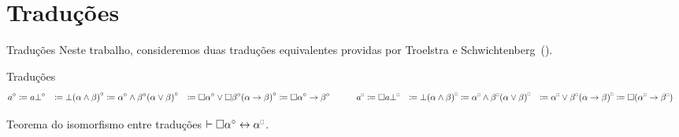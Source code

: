 \documentclass[table]{beamer}
\newcommand{\smallsquare}{{\scalebox{0.45}{$\square$}}}
\def\\{}%
\begin{document}
    \section[]{Traduções}
    \begin{frame}{Traduções}
        \justifying{}
        Neste trabalho, consideremos duas traduções equivalentes providas por Troelstra e Schwichtenberg~(\citeyear{Troelstra}).
        \begin{block}{Traduções}
            \begin{equation*}
            \begin{aligned}[t]
                a^\circ                       & \coloneqq a \\
                \bot^\circ                    & \coloneqq \bot \\
                {(\alpha \wedge \beta)}^\circ & \coloneqq \alpha^\circ \wedge \beta^\circ \\
                {(\alpha \vee \beta)}^\circ   & \coloneqq \Box \alpha^\circ \vee \Box \beta^\circ \\
                {(\alpha \to \beta)}^\circ    & \coloneqq \Box \alpha^\circ \to \beta^\circ
            \end{aligned}
            \qquad
            \begin{aligned}[t]
                a^\smallsquare                       & \coloneqq \Box a \\
                \bot^\smallsquare                    & \coloneqq \bot \\
                {(\alpha \wedge \beta)}^\smallsquare & \coloneqq \alpha^\smallsquare \wedge \beta^\smallsquare \\
                {(\alpha \vee \beta)}^\smallsquare   & \coloneqq \alpha^\smallsquare \vee \beta^\smallsquare \\
                {(\alpha \to \beta)}^\smallsquare    & \coloneqq \Box(\alpha^\smallsquare \to \beta^\smallsquare)
            \end{aligned}
            \end{equation*}
        \end{block}

        \begin{block}{Teorema do isomorfismo entre traduções}
            $\vdash\Box\alpha^\circ\leftrightarrow\alpha^\smallsquare$.
        \end{block}
    \end{frame}
\end{document}
